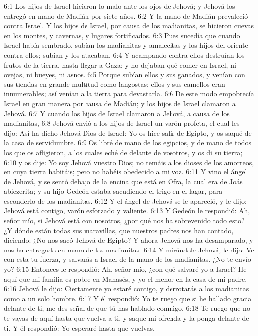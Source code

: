 6:1 Los hijos de Israel hicieron lo malo ante los ojos de Jehová; y Jehová los entregó en mano de Madián por siete años.  
6:2 Y la mano de Madián prevaleció contra Israel. Y los hijos de Israel, por causa de los madianitas, se hicieron cuevas en los montes, y cavernas, y lugares fortificados.  
6:3 Pues sucedía que cuando Israel había sembrado, subían los madianitas y amalecitas y los hijos del oriente contra ellos; subían y los atacaban.  
6:4 Y acampando contra ellos destruían los frutos de la tierra, hasta llegar a Gaza; y no dejaban qué comer en Israel, ni ovejas, ni bueyes, ni asnos.  
6:5 Porque subían ellos y sus ganados, y venían con sus tiendas en grande multitud como langostas; ellos y sus camellos eran innumerables; así venían a la tierra para devastarla.  
6:6 De este modo empobrecía Israel en gran manera por causa de Madián; y los hijos de Israel clamaron a Jehová.  
6:7 Y cuando los hijos de Israel clamaron a Jehová, a causa de los madianitas,  
6:8 Jehová envió a los hijos de Israel un varón profeta, el cual les dijo: Así ha dicho Jehová Dios de Israel: Yo os hice salir de Egipto, y os saqué de la casa de servidumbre.  
6:9 Os libré de mano de los egipcios, y de mano de todos los que os afligieron, a los cuales eché de delante de vosotros, y os di su tierra;  
6:10 y os dije: Yo soy Jehová vuestro Dios; no temáis a los dioses de los amorreos, en cuya tierra habitáis; pero no habéis obedecido a mi voz.  
6:11 Y vino el ángel de Jehová, y se sentó debajo de la encina que está en Ofra, la cual era de Joás abiezerita; y su hijo Gedeón estaba sacudiendo el trigo en el lagar, para esconderlo de los madianitas.  
6:12 Y el ángel de Jehová se le apareció, y le dijo: Jehová está contigo, varón esforzado y valiente.  
6:13 Y Gedeón le respondió: Ah, señor mío, si Jehová está con nosotros, ¿por qué nos ha sobrevenido todo esto? ¿Y dónde están todas sus maravillas, que nuestros padres nos han contado, diciendo: ¿No nos sacó Jehová de Egipto? Y ahora Jehová nos ha desamparado, y nos ha entregado en mano de los madianitas.  
6:14 Y mirándole Jehová, le dijo: Ve con esta tu fuerza, y salvarás a Israel de la mano de los madianitas. ¿No te envío yo?  
6:15 Entonces le respondió: Ah, señor mío, ¿con qué salvaré yo a Israel? He aquí que mi familia es pobre en Manasés, y yo el menor en la casa de mi padre.  
6:16 Jehová le dijo: Ciertamente yo estaré contigo, y derrotarás a los madianitas como a un solo hombre.  
6:17 Y él respondió: Yo te ruego que si he hallado gracia delante de ti, me des señal de que tú has hablado conmigo.  
6:18 Te ruego que no te vayas de aquí hasta que vuelva a ti, y saque mi ofrenda y la ponga delante de ti. Y él respondió: Yo esperaré hasta que vuelvas.  
